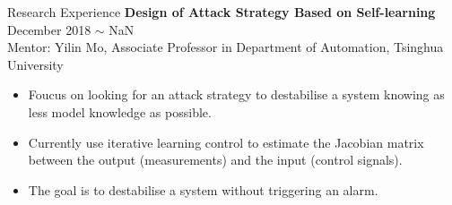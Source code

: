 \documentclass{resume} %
\begin{document}
\begin{rSection}{Research Experience}
{\textbf{Design of Attack Strategy Based on Self-learning}} \hfill December 2018 $\sim$ NaN\\
Mentor: Yilin Mo, Associate Professor in Department of Automation, Tsinghua University\\
	\begin{itemize}
		\item Foucus on looking for an attack strategy to destabilise a system knowing as less model knowledge as possible.\\
		\item Currently use iterative learning control to estimate the Jacobian matrix between the output (measurements) and the input (control signals).\\
		\item The goal is to destabilise a system without triggering an alarm.
	\end{itemize}

\end{rSection} 


\end{document}
